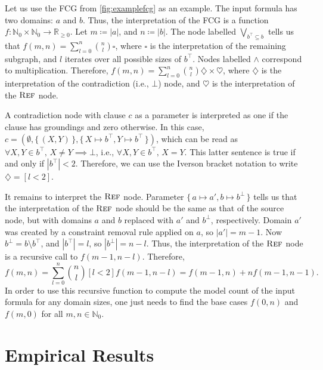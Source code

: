 \begin{example}\label{example:interpretation}
  Let us use the FCG from \cref{fig:examplefcg} as an example. The input formula
  has two domains: $a$ and $b$. Thus, the interpretation of the FCG is a
  function
  $f\colon \mathbb{N}_{0} \times \mathbb{N}_{0} \to \mathbb{R}_{\ge 0}$. Let
  $m \coloneqq |a|$, and $n \coloneqq |b|$. The node labelled
  $\bigvee_{b^{\top} \subseteq b}$ tells us that
  $f(m, n) = \sum_{l = 0}^{n} \binom{n}{l} \square$, where $\square$ is the
  interpretation of the remaining subgraph, and $l$ iterates over all possible
  sizes of $b^{\top}$. Nodes labelled $\land$ correspond to multiplication.
  Therefore,
  $f(m, n) = \sum_{l = 0}^{n} \binom{n}{l} \diamondsuit \times \heartsuit$,
  where $\diamondsuit$ is the interpretation of the contradiction (i.e., $\bot$)
  node, and $\heartsuit$ is the interpretation of the $\operatorname{\textsc{Ref}}$ node.

  A contradiction node with clause $c$ as a parameter is interpreted as one if
  the clause has groundings and zero otherwise. In this case,
  $c = (\emptyset, \{\, (X, Y) \,\}, \{\, X \mapsto b^\top, Y \mapsto b^\top \,\})$,
  which can be read as $\forall X, Y \in b^{\top}\text{, }X \ne Y \implies \bot$,
  i.e., $\forall X, Y \in b^{\top}\text{, }X = Y$. This
  latter sentence is true if and only if $|b^{\top}| < 2$. Therefore, we
  can use the Iverson bracket notation to write $\diamondsuit = [l < 2]$.

  It remains to interpret the $\operatorname{\textsc{Ref}}$ node. Parameter
  $\{\, a \mapsto a', b \mapsto b^\bot \,\}$ tells us that the interpretation of
  the $\operatorname{\textsc{Ref}}$ node should be the same as that of the source node, but with
  domains $a$ and $b$ replaced with $a'$ and $b^{\bot}$, respectively. Domain
  $a'$ was created by a constraint removal rule applied on $a$, so
  $|a'| = m - 1$. Now $b^{\bot} = b \setminus b^{\top}$, and $|b^{\top}| = l$,
  so $|b^{\bot}| = n - l$. Thus, the interpretation of the $\operatorname{\textsc{Ref}}$ node is a
  recursive call to $f(m - 1, n - l)$. Therefore,
  \begin{equation}\label{eq:solution}
    f(m, n) = \sum_{l = 0}^{n} \binom{n}{l} [l < 2] f(m-1, n-l) = f(m-1, n) + n f(m-1, n-1).
  \end{equation}
  In order to use this recursive function to compute the model count of the
  input formula for any domain sizes, one just needs to find the base cases
  $f(0, n)$ and $f(m, 0)$ for all $m, n \in \mathbb{N}_{0}$.
\end{example}

\section{Empirical Results}\label{sec:results} %

